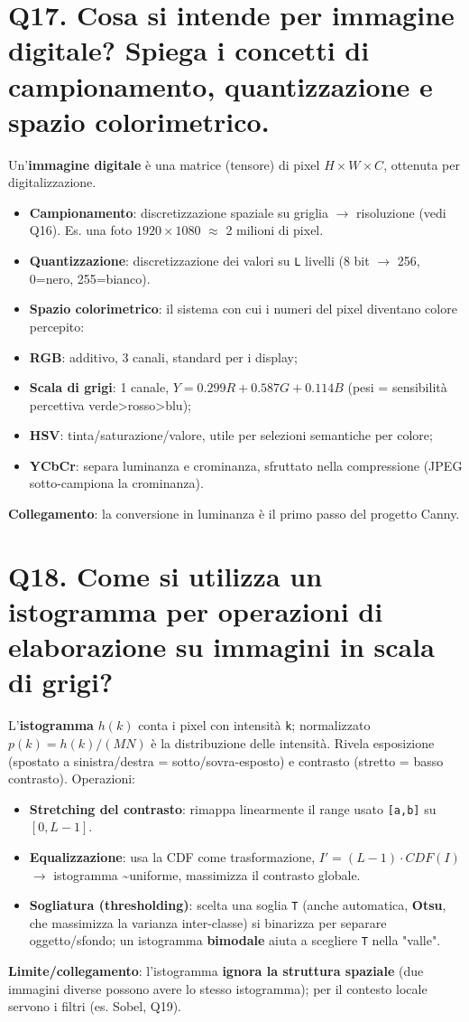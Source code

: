 \documentclass[11pt,a4paper]{article}
\begin{document}
\section*{Q17. Cosa si intende per immagine digitale? Spiega i concetti di campionamento, quantizzazione e spazio colorimetrico.}
Un'\textbf{immagine digitale} è una matrice (tensore) di pixel $H\times W\times C$, ottenuta per digitalizzazione.
\begin{itemize}
\item \textbf{Campionamento}: discretizzazione spaziale su griglia $\to $ risoluzione (vedi Q16). Es. una foto $1920\times 1080$ $\approx $ 2 milioni di pixel.
\item \textbf{Quantizzazione}: discretizzazione dei valori su \texttt{L} livelli (8 bit $\to $ 256, 0=nero, 255=bianco).
\item \textbf{Spazio colorimetrico}: il sistema con cui i numeri del pixel diventano colore percepito:
\item \textbf{RGB}: additivo, 3 canali, standard per i display;
\item \textbf{Scala di grigi}: 1 canale, $Y = 0.299R + 0.587G + 0.114B$ (pesi = sensibilità percettiva verde>rosso>blu);
\item \textbf{HSV}: tinta/saturazione/valore, utile per selezioni semantiche per colore;
\item \textbf{YCbCr}: separa luminanza e crominanza, sfruttato nella compressione (JPEG sotto-campiona la crominanza).
\end{itemize}
\textbf{Collegamento}: la conversione in luminanza è il primo passo del progetto Canny.
\newpage
\section*{Q18. Come si utilizza un istogramma per operazioni di elaborazione su immagini in scala di grigi?}
L'\textbf{istogramma} $h(k)$ conta i pixel con intensità \texttt{k}; normalizzato $p(k)=h(k)/(MN)$ è la distribuzione delle intensità. Rivela esposizione (spostato a sinistra/destra = sotto/sovra-esposto) e contrasto (stretto = basso contrasto).
Operazioni:
\begin{itemize}
\item \textbf{Stretching del contrasto}: rimappa linearmente il range usato \texttt{[a,b]} su $[0,L-1]$.
\item \textbf{Equalizzazione}: usa la CDF come trasformazione, $I' = (L-1)\cdot CDF(I)$ $\to $ istogramma \textasciitilde{}uniforme, massimizza il contrasto globale.
\item \textbf{Sogliatura (thresholding)}: scelta una soglia \texttt{T} (anche automatica, \textbf{Otsu}, che massimizza la varianza inter-classe) si binarizza per separare oggetto/sfondo; un istogramma \textbf{bimodale} aiuta a scegliere \texttt{T} nella "valle".
\end{itemize}
\textbf{Limite/collegamento}: l'istogramma \textbf{ignora la struttura spaziale} (due immagini diverse possono avere lo stesso istogramma); per il contesto locale servono i filtri (es. Sobel, Q19).
\newpage
\end{document}
